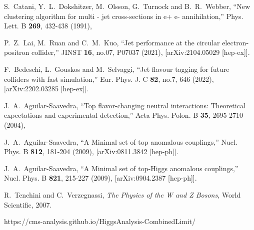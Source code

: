 \documentclass[11pt,onecolumn,english,showpacs,preprintnumbers,amsmath,amssymb,floatfix,nofootinbib]{revtex4-1}
\begin{document}
\begin{thebibliography}{}
S.~Catani, Y.~L.~Dokshitzer, M.~Olsson, G.~Turnock and B.~R.~Webber,
``New clustering algorithm for multi - jet cross-sections in e+ e- annihilation,''
Phys. Lett. B \textbf{269}, 432-438 (1991),





P.~Z.~Lai, M.~Ruan and C.~M.~Kuo,
``Jet performance at the circular electron-positron collider,''
JINST \textbf{16}, no.07, P07037 (2021),
[arXiv:2104.05029 [hep-ex]].







F.~Bedeschi, L.~Gouskos and M.~Selvaggi,
``Jet flavour tagging for future colliders with fast simulation,''
Eur. Phys. J. C \textbf{82}, no.7, 646 (2022),
[arXiv:2202.03285 [hep-ex]].




J.~A.~Aguilar-Saavedra,
``Top flavor-changing neutral interactions: Theoretical expectations and experimental detection,''
Acta Phys. Polon. B \textbf{35}, 2695-2710 (2004),




J.~A.~Aguilar-Saavedra,
``A Minimal set of top anomalous couplings,''
Nucl. Phys. B \textbf{812}, 181-204 (2009),
[arXiv:0811.3842 [hep-ph]].



J.~A.~Aguilar-Saavedra,
``A Minimal set of top-Higgs anomalous couplings,''
Nucl. Phys. B \textbf{821}, 215-227 (2009),
[arXiv:0904.2387 [hep-ph]].





R.~Tenchini and C.~Verzegnassi, \textit{The Physics of the W and Z Bosons}, World Scientific, 2007.





https://cms-analysis.github.io/HiggsAnalysis-CombinedLimit/





	
\end{thebibliography}
%
\end{document}

